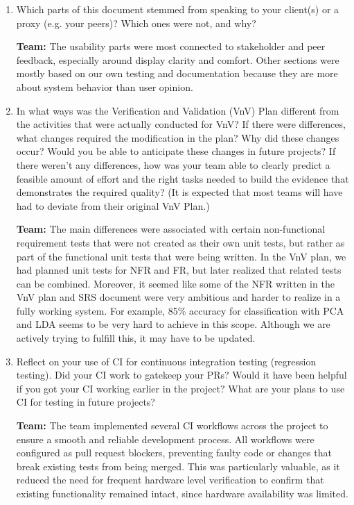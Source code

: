 \documentclass[12pt, titlepage]{article}
\begin{document}
{\begin{enumerate}
  \item Which parts of this document stemmed from speaking to your client(s) or
  a proxy (e.g. your peers)? Which ones were not, and why?
  
  \textbf{Team:} The usability parts were most connected to stakeholder and peer
  feedback, especially around display clarity and comfort. Other sections were
  mostly based on our own testing and documentation because they are more about
  system behavior than user opinion.

  \item In what ways was the Verification and Validation (VnV) Plan different
  from the activities that were actually conducted for VnV?  If there were
  differences, what changes required the modification in the plan?  Why did
  these changes occur?  Would you be able to anticipate these changes in future
  projects?  If there weren't any differences, how was your team able to clearly
  predict a feasible amount of effort and the right tasks needed to build the
  evidence that demonstrates the required quality?  (It is expected that most
  teams will have had to deviate from their original VnV Plan.)

  \textbf{Team:} The main differences were associated with certain
  non-functional requirement tests that were not created as their own unit
  tests, but rather as part of the functional unit tests that were being
  written. In the VnV plan, we had planned unit tests for NFR and FR, but later
  realized that related tests can be combined. Moreover, it seemed like some of
  the NFR written in the VnV plan and SRS document were very ambitious and
  harder to realize in a fully working system. For example, 85\% accuracy for
  classification with PCA and LDA seems to be very hard to achieve in this
  scope. Although we are actively trying to fulfill this, it may have to be
  updated.

  \item Reflect on your use of CI for continuous integration testing (regression
  testing). Did your CI work to gatekeep your PRs?  Would it have been helpful
  if you got your CI working earlier in the project?  What are your plans to use
  CI for testing in future projects?

  \textbf{Team:} The team implemented several CI workflows across the project to
  ensure a smooth and reliable development process. All workflows were
  configured as pull request blockers, preventing faulty code or changes that
  break existing tests from being merged. This was particularly valuable, as it
  reduced the need for frequent hardware level verification to confirm that
  existing functionality remained intact, since hardware availability was
  limited.
  

\end{enumerate}}
\end{document}
